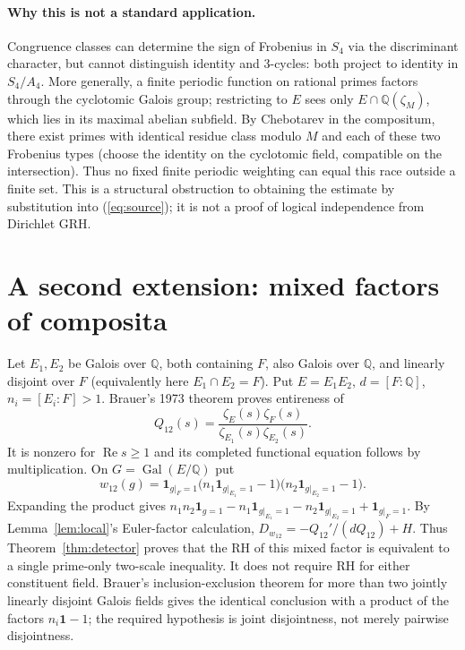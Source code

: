 \documentclass[11pt]{article}
\theoremstyle{remark}\newtheorem{remark}[theorem]{Remark}
\newcommand{\Q}{\mathbb Q}\newcommand{\C}{\mathbb C}\newcommand{\R}{\mathbb R}\newcommand{\ind}{\mathbf 1}\newcommand{\ord}{\operatorname{ord}}\newcommand{\Rea}{\operatorname{Re}}
\begin{document}
\paragraph{Why this is not a standard application.} Congruence classes can determine the sign of Frobenius in $S_4$ via the discriminant character, but cannot distinguish identity and 3-cycles: both project to identity in $S_4/A_4$. More generally, a finite periodic function on rational primes factors through the cyclotomic Galois group; restricting to $E$ sees only $E\cap\Q(\zeta_M)$, which lies in its maximal abelian subfield. By Chebotarev in the compositum, there exist primes with identical residue class modulo $M$ and each of these two Frobenius types (choose the identity on the cyclotomic field, compatible on the intersection). Thus no fixed finite periodic weighting can equal this race outside a finite set. This is a structural obstruction to obtaining the estimate by substitution into (\ref{eq:source}); it is not a proof of logical independence from Dirichlet GRH.

\section{A second extension: mixed factors of composita}
Let $E_1,E_2$ be Galois over $\Q$, both containing $F$, also Galois over $\Q$, and linearly disjoint over $F$ (equivalently here $E_1\cap E_2=F$). Put $E=E_1E_2$, $d=[F:\Q]$, $n_i=[E_i:F]>1$. Brauer's 1973 theorem \cite{brauer} proves entireness of
\[
 Q_{12}(s)=\frac{\zeta_E(s)\zeta_F(s)}{\zeta_{E_1}(s)\zeta_{E_2}(s)}.
\]
It is nonzero for $\Rea s\ge1$ and its completed functional equation follows by multiplication. On $G=\operatorname{Gal}(E/\Q)$ put
\[
 w_{12}(g)=\ind_{g|_F=1}\big(n_1\ind_{g|_{E_1}=1}-1\big)
                            \big(n_2\ind_{g|_{E_2}=1}-1\big).
\]
Expanding the product gives $n_1n_2\ind_{g=1}-n_1\ind_{g|_{E_1}=1}-n_2\ind_{g|_{E_2}=1}+\ind_{g|_F=1}$. By Lemma~\ref{lem:local}'s Euler-factor calculation, $D_{w_{12}}=-Q_{12}'/(dQ_{12})+H$. Thus Theorem~\ref{thm:detector} proves that the RH of this mixed factor is equivalent to a single prime-only two-scale inequality. It does not require RH for either constituent field. Brauer's inclusion-exclusion theorem for more than two jointly linearly disjoint Galois fields gives the identical conclusion with a product of the factors $n_i\ind-1$; the required hypothesis is joint disjointness, not merely pairwise disjointness.
\end{document}

